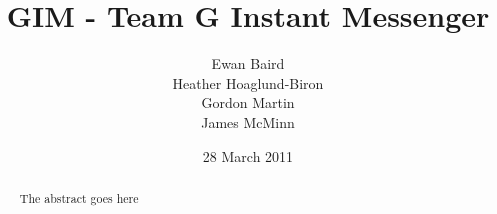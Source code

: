 \documentclass{l3proj}
\begin{document}
\title{GIM - Team G Instant Messenger}
\author{Ewan Baird \\
Heather Hoaglund-Biron \\
Gordon Martin \\
James McMinn}
\date{28 March 2011}
\maketitle
\begin{abstract}

The abstract goes here

\end{abstract}
\educationalconsent
\tableofcontents

















\end{document}
